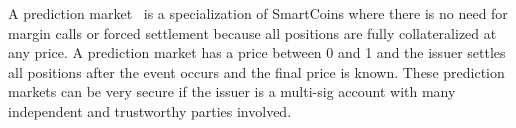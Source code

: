 A prediction market~\cite{wiki_pm} is
a specialization of SmartCoins where there is no need for margin calls or
forced settlement because all positions are fully collateralized at any price.
A prediction market has a price between 0 and 1 and the issuer settles all
positions after the event occurs and the final price is known. These
prediction markets can be very secure if the issuer is a multi-sig account with
many independent and trustworthy parties involved.
